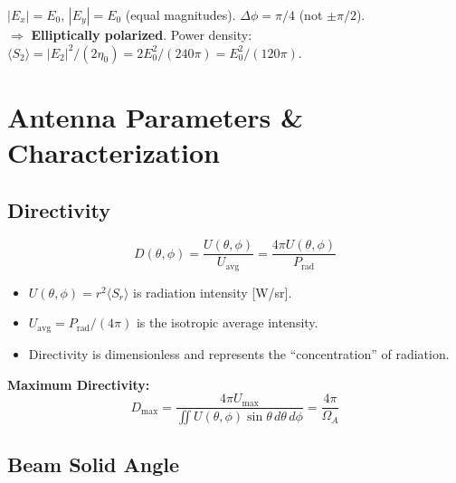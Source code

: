 \documentclass[10pt,letterpaper]{article}
\newcommand{\vE}{\vec{E}}
\newcommand{\xhat}{\hat{x}}
\newcommand{\yhat}{\hat{y}}
\begin{document}
\begin{tcolorbox}[examplebox, title={HW1 P1 Example: Polarization of $\vE_2 = E_0(\xhat + e^{j\pi/4}\yhat)e^{j(\omega t - kz)}$}]
$|E_x| = E_0$, $|E_y| = E_0$ (equal magnitudes). $\Delta\phi = \pi/4$ (not $\pm\pi/2$). \\
$\Rightarrow$ \textbf{Elliptically polarized}. Power density: $\langle S_2\rangle = |E_2|^2/(2\eta_0) = 2E_0^2/(240\pi) = E_0^2/(120\pi)$.
\end{tcolorbox}

\section{Antenna Parameters \& Characterization}

\subsection{Directivity}

\begin{tcolorbox}[formulabox, title={Directivity Definition}]
\begin{equation}
  D(\theta,\phi) = \frac{U(\theta,\phi)}{U_\mathrm{avg}} = \frac{4\pi U(\theta,\phi)}{P_\mathrm{rad}}
\end{equation}
\begin{itemize}[noitemsep]
  \item $U(\theta,\phi) = r^2\langle S_r\rangle$ is radiation intensity [W/sr].
  \item $U_\mathrm{avg} = P_\mathrm{rad}/(4\pi)$ is the isotropic average intensity.
  \item Directivity is dimensionless and represents the ``concentration'' of radiation.
\end{itemize}
\textbf{Maximum Directivity:}
\begin{equation}
  D_\mathrm{max} = \frac{4\pi U_\mathrm{max}}{\iint U(\theta,\phi)\sin\theta\,d\theta\,d\phi} = \frac{4\pi}{\Omega_A}
\end{equation}
\end{tcolorbox}

\subsection{Beam Solid Angle}
\end{document}

